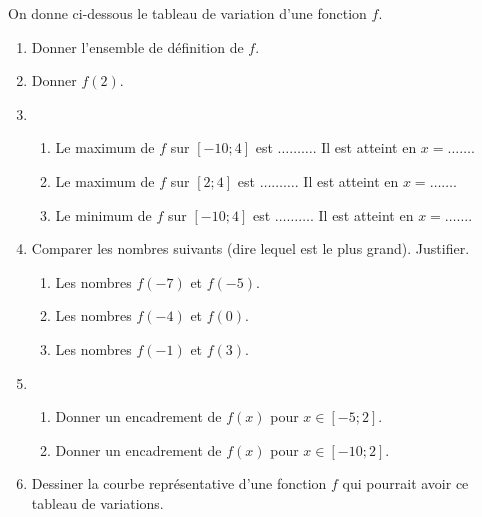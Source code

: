 \documentclass[11pt]{article}
\begin{document}
\begin{app}
  On donne ci-dessous le tableau de variation d'une fonction $f$.
  \begin{center}
  \end{center}
  \begin{enumerate}
    \item Donner l'ensemble de définition de $f$.
    \item Donner $f(2)$.
    \item \begin{enumerate}
        \item Le maximum de $f$ sur $[-10;4]$ est $\dots\dots\dots$. Il est
          atteint en $x=\dots\dots$.
        \item Le maximum de $f$ sur $[2;4]$ est $\dots\dots\dots$. Il est
          atteint en $x=\dots\dots$.
        \item Le minimum de $f$ sur $[-10;4]$ est $\dots\dots\dots$. Il est
          atteint en $x=\dots\dots$.
      \end{enumerate}
    \item Comparer les nombres suivants (dire lequel est le plus grand). Justifier.
      \begin{enumerate}
        \item Les nombres $f(-7)$ et $f(-5)$.
        \item Les nombres $f(-4)$ et $f(0)$.
        \item Les nombres $f(-1)$ et $f(3)$.
      \end{enumerate}
    \item 
      \begin{enumerate}
        \item Donner un encadrement de $f(x)$ pour $x\in[-5;2]$.
        \item Donner un encadrement de $f(x)$ pour $x\in[-10;2]$.
      \end{enumerate}
    \item Dessiner la courbe représentative d'une fonction $f$ qui pourrait
      avoir ce tableau de variations.
  \end{enumerate}
\end{app}



\end{document}
